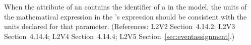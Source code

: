 When the  attribute of an \EventAssignment
contains the identifier of a \Parameter in the model, the
units of the mathematical expression in the
\EventAssignment's  expression should be
consistent with the units declared for that parameter.
(References: L2V2 Section~4.14.2; L2V3 Section~4.14.4; L2V4 Section~4.14.4; L2V5 Section~\ref{sec:eventassignment}.)
